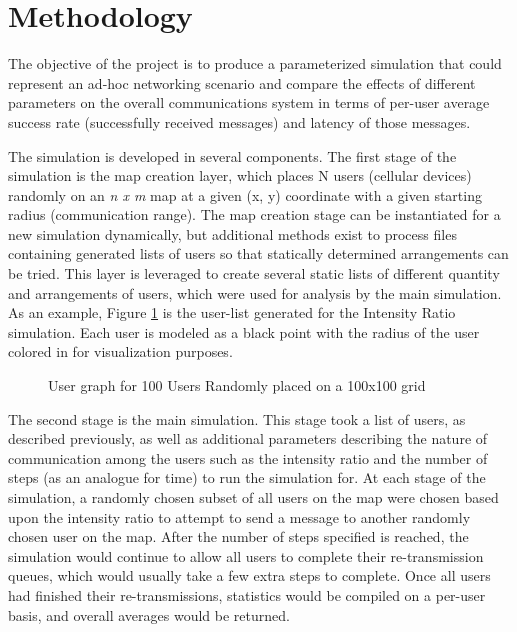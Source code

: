\section{Methodology}
The objective of the project is to produce a parameterized simulation 
that could represent an ad-hoc networking scenario and compare the effects 
of different parameters on the overall communications system in terms of 
per-user average success rate (successfully received messages) 
and latency of those messages.

The simulation is developed in several components.
The first stage of the simulation is the map creation layer,
which places N users (cellular devices) randomly on an \textit{n x m} map at a
given (x, y) coordinate with a given starting radius (communication range).
The map creation stage can be instantiated for a new simulation dynamically, 
but additional methods exist to process files containing generated lists of 
users so that statically determined arrangements can be tried.
This layer is leveraged to create several static lists of different quantity
and arrangements of users, which were used for analysis by the main simulation.
As an example, Figure \ref{fig:usergraph} is the user-list
generated for the Intensity Ratio simulation.
Each user is modeled as a black point with the radius of the user colored in
for visualization purposes.
\par
\begin{figure}
    
    \caption{User graph for 100 Users Randomly placed on a 100x100 grid}
    \label{fig:usergraph}
\end{figure}
\par

The second stage is the main simulation.
This stage took a list of users, as described previously, as well as additional
parameters describing the nature of communication among the users such as
the intensity ratio and the number of steps (as an analogue for time) to run 
the simulation for.
At each stage of the simulation, a randomly chosen subset of all users on the map
were chosen based upon the intensity ratio to attempt to send a message to another
randomly chosen user on the map.
After the number of steps specified is reached, the simulation would continue
to allow all users to complete their re-transmission queues, which would usually
take a few extra steps to complete.
Once all users had finished their re-transmissions, statistics would be compiled
on a per-user basis, and overall averages would be returned.

